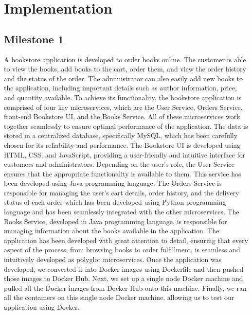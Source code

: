 \section{Implementation}
\subsection{Milestone 1}
A bookstore application is developed to order books online. The customer is able to view the books, add books to the cart, order them, and view the order history and the status of the order. The administrator can also easily add new books to the application, including important details such as author information, price, and quantity available. To achieve its functionality, the bookstore application is comprised of four key microservices, which are the User Service, Orders Service, front-end Bookstore UI, and the Books Service. All of these microservices work together seamlessly to ensure optimal performance of the application. The data is stored in a centralized database, specifically MySQL, which has been carefully chosen for its reliability and performance. The Bookstore UI is developed using HTML, CSS, and JavaScript, providing a user-friendly and intuitive interface for customers and administrators. Depending on the user's role, the User Service ensures that the appropriate functionality is available to them. This  service has been developed using Java programming language. The Orders Service is responsible for managing the user's cart details, order history, and the delivery status of each order which has been developed using Python programming language and has been seamlessly integrated with the other microservices. The Books Service, developed in Java programming language, is responsible for managing information about the books available in the application.  The application has been developed with great attention to detail, ensuring that every aspect of the process, from browsing books to order fulfillment, is seamless and intuitively developed as polyglot microservices. Once the application was developed, we converted it into Docker images using Dockerfile and then pushed those images to Docker Hub. Next, we set up a single node Docker machine and pulled all the Docker images from Docker Hub onto this machine. Finally, we ran all the containers on this single node Docker machine, allowing us to test our application using Docker.

